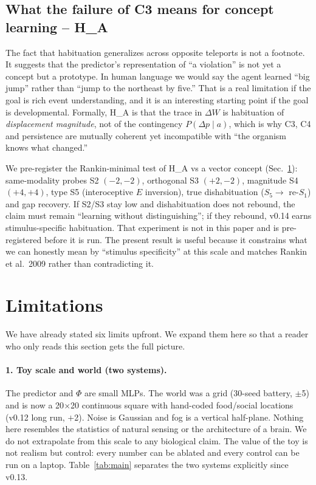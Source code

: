 \documentclass[11pt,a4paper]{article}
\begin{document}
\subsection{What the failure of C3 means for concept learning -- H\_A}

The fact that habituation generalizes across opposite teleports is not a footnote. It suggests that the predictor's representation of ``a violation'' is not yet a concept but a prototype. In human language we would say the agent learned ``big jump'' rather than ``jump to the northeast by five.'' That is a real limitation if the goal is rich event understanding, and it is an interesting starting point if the goal is developmental. Formally, H\_A is that the trace in $\Delta W$ is habituation of \textit{displacement magnitude}, not of the contingency $P(\Delta p\mid a)$, which is why C3, C4 and persistence are mutually coherent yet incompatible with ``the organism knows what changed.''

We pre-register the Rankin-minimal test of H\_A vs a vector concept (Sec.~\ref{sec:limitations}): same-modality probes S2 $(-2,-2)$, orthogonal S3 $(+2,-2)$, magnitude S4 $(+4,+4)$, type S5 (interoceptive $E$ inversion), true dishabituation ($S_5\rightarrow$ re-$S_1$) and gap recovery. If S2/S3 stay low and dishabituation does not rebound, the claim must remain ``learning without distinguishing''; if they rebound, v0.14 earns stimulus-specific habituation. That experiment is not in this paper and is pre-registered before it is run. The present result is useful because it constrains what we can honestly mean by ``stimulus specificity'' at this scale and matches Rankin et al.\ 2009 rather than contradicting it.

\section{Limitations}
\label{sec:limitations}

We have already stated six limits upfront. We expand them here so that a reader who only reads this section gets the full picture.

\paragraph{1. Toy scale and world (two systems).} The predictor and $\Phi$ are small MLPs. The world was a grid (30-seed battery, $\pm$5) and is now a 20$\times$20 continuous square with hand-coded food/social locations (v0.12 long run, $+$2). Noise is Gaussian and fog is a vertical half-plane. Nothing here resembles the statistics of natural sensing or the architecture of a brain. We do not extrapolate from this scale to any biological claim. The value of the toy is not realism but control: every number can be ablated and every control can be run on a laptop. Table~\ref{tab:main} separates the two systems explicitly since v0.13.
\end{document}
